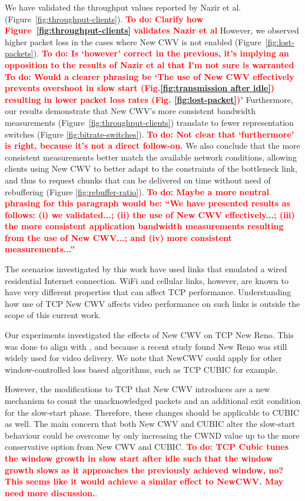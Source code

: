 \documentclass[10pt,sigconf]{acmart}
\newcommand{\todo}[1]{\textbf{\textcolor{red}{To do: #1}}}
\begin{document}
We have validated the throughput values reported by Nazir et al.~\cite{Nazir-2014-performance-evaluation-congestion-window-validation-dash-newcwv} (Figure~\ref{fig:throughput-clients}). 
\todo{Clarify how Figure~\ref{fig:throughput-clients} validates Nazir et al}
However, we observed higher packet loss in the cases where New CWV is not enabled (Figure~\ref{fig:lost-packets}). 
\todo{Is `however' correct in the previous, it's implying an opposition to the results of Nazir et al that I'm not sure is warranted}
\todo{Would a clearer phrasing be `The use of New CWV effectively prevents overshoot in slow start (Fig.\ref{fig:transmission after idle}) resulting in lower packet loss rates (Fig. \ref{fig:lost-packet})'}
Furthermore, our results demonstrate that New CWV's more consistent bandwidth measurements (Figure~\ref{fig:throughput-clients}) translate to fewer representation switches (Figure \ref{fig:bitrate-switches}). 
\todo{Not clear that `furthermore' is right, because it's not a direct follow-on.}
We also conclude that the more consistent measurements better match the available network conditions, allowing clients using New CWV to better adapt to the constraints of the bottleneck link, and thus to request chunks that can be delivered on time without need of rebuffering (Figure \ref{fig:rebuffer-ratio}).
\todo{Maybe a more neutral phrasing for this paragraph would be: ``We have presented results as follows: (i) we validated...; (ii) the use of New CWV effectively...; (iii) the more consistent application bandwidth measurements resulting from the use of New CWV...; and (iv) more consistent measurements...''}

The scenarios investigated by this work have used links that emulated a wired
residential Internet connection.  WiFi and cellular links, however, are known
to have very different properties that can affect TCP performance. Understanding
how use of TCP New CWV affects video performance on such links is outside the
scope of this current work.

Our experiments investigated the effects of New CWV on TCP New Reno. This was done to align with
\cite{Nazir-2014-performance-evaluation-congestion-window-validation-dash-newcwv},
and because a recent study \cite{Mishra-2019-the-great-internet-tcp-congestion-control-census}
found New Reno was still widely used for video delivery.
We note that NewCWV could apply for other window-controlled loss based
algorithms, such as TCP CUBIC for example. 

 However, the modifications to TCP that New CWV introduces are a new mechanism to count the unacknowledged packets and an additional exit condition for the slow-start phase. Therefore, these changes should be applicable to CUBIC as well. The main concern that both New CWV and CUBIC alter the slow-start behaviour could be overcome by only increasing the CWND value up to the more conservative option from New CWV and CUBIC.
\todo{TCP Cubic tunes the window growth in slow start after idle such that
the window growth slows as it approaches the previously achieved window,
no? This seems like it would achieve a similar effect to NewCWV. May need
more discussion.}.
\end{document}

